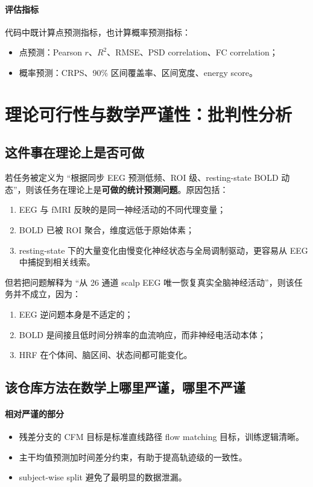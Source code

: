 \documentclass[11pt,a4paper]{ctexart}
\begin{document}
\paragraph{评估指标}
代码中既计算点预测指标，也计算概率预测指标：
\begin{itemize}
  \item 点预测：Pearson $r$、$R^2$、RMSE、PSD correlation、FC correlation；
  \item 概率预测：CRPS、90\% 区间覆盖率、区间宽度、energy score。
\end{itemize}

\section{理论可行性与数学严谨性：批判性分析}

\subsection{这件事在理论上是否可做}

若任务被定义为 ``根据同步 EEG 预测低频、ROI 级、resting-state BOLD 动态''，则该任务在理论上是\textbf{可做的统计预测问题}。原因包括：
\begin{enumerate}
  \item EEG 与 fMRI 反映的是同一神经活动的不同代理变量；
  \item BOLD 已被 ROI 聚合，维度远低于原始体素；
  \item resting-state 下的大量变化由慢变化神经状态与全局调制驱动，更容易从 EEG 中捕捉到相关线索。
\end{enumerate}

但若把问题解释为 ``从 26 通道 scalp EEG 唯一恢复真实全脑神经活动''，则该任务并不成立，因为：
\begin{enumerate}
  \item EEG 逆问题本身是不适定的；
  \item BOLD 是间接且低时间分辨率的血流响应，而非神经电活动本体；
  \item HRF 在个体间、脑区间、状态间都可能变化。
\end{enumerate}

\subsection{该仓库方法在数学上哪里严谨，哪里不严谨}

\paragraph{相对严谨的部分}
\begin{itemize}
  \item 残差分支的 CFM 目标是标准直线路径 flow matching 目标，训练逻辑清晰。
  \item 主干均值预测加时间差分约束，有助于提高轨迹级的一致性。
  \item subject-wise split 避免了最明显的数据泄漏。
\end{itemize}
\end{document}
